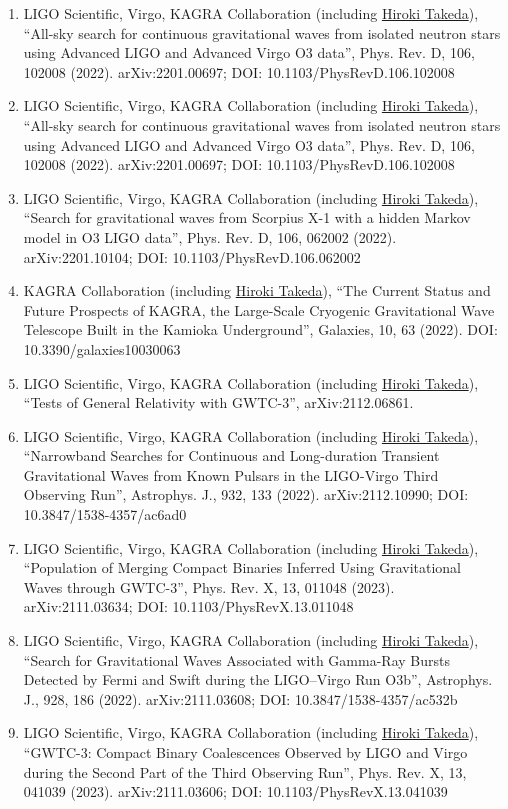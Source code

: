 \documentclass[uplatex, 11pt]{jsarticle}
\begin{document}
\begin{enumerate}
\item LIGO Scientific, Virgo, KAGRA Collaboration (including \uline{Hiroki Takeda}), “All-sky search for continuous gravitational waves from isolated neutron stars using Advanced LIGO and Advanced Virgo O3 data”, Phys. Rev. D, 106, 102008 (2022). arXiv:2201.00697; DOI: 10.1103/PhysRevD.106.102008
\item LIGO Scientific, Virgo, KAGRA Collaboration (including \uline{Hiroki Takeda}), “All-sky search for continuous gravitational waves from isolated neutron stars using Advanced LIGO and Advanced Virgo O3 data”, Phys. Rev. D, 106, 102008 (2022). arXiv:2201.00697; DOI: 10.1103/PhysRevD.106.102008
\item LIGO Scientific, Virgo, KAGRA Collaboration (including \uline{Hiroki Takeda}), “Search for gravitational waves from Scorpius X-1 with a hidden Markov model in O3 LIGO data”, Phys. Rev. D, 106, 062002 (2022). arXiv:2201.10104; DOI: 10.1103/PhysRevD.106.062002
\item KAGRA Collaboration (including \uline{Hiroki Takeda}), “The Current Status and Future Prospects of KAGRA, the Large-Scale Cryogenic Gravitational Wave Telescope Built in the Kamioka Underground”, Galaxies, 10, 63 (2022). DOI: 10.3390/galaxies10030063
\item LIGO Scientific, Virgo, KAGRA Collaboration (including \uline{Hiroki Takeda}), “Tests of General Relativity with GWTC-3”, arXiv:2112.06861.
\item LIGO Scientific, Virgo, KAGRA Collaboration (including \uline{Hiroki Takeda}), “Narrowband Searches for Continuous and Long-duration Transient Gravitational Waves from Known Pulsars in the LIGO-Virgo Third Observing Run”, Astrophys. J., 932, 133 (2022). arXiv:2112.10990; DOI: 10.3847/1538-4357/ac6ad0
\item LIGO Scientific, Virgo, KAGRA Collaboration (including \uline{Hiroki Takeda}), “Population of Merging Compact Binaries Inferred Using Gravitational Waves through GWTC-3”, Phys. Rev. X, 13, 011048 (2023). arXiv:2111.03634; DOI: 10.1103/PhysRevX.13.011048
\item LIGO Scientific, Virgo, KAGRA Collaboration (including \uline{Hiroki Takeda}), “Search for Gravitational Waves Associated with Gamma-Ray Bursts Detected by Fermi and Swift during the LIGO–Virgo Run O3b”, Astrophys. J., 928, 186 (2022). arXiv:2111.03608; DOI: 10.3847/1538-4357/ac532b
\item LIGO Scientific, Virgo, KAGRA Collaboration (including \uline{Hiroki Takeda}), “GWTC-3: Compact Binary Coalescences Observed by LIGO and Virgo during the Second Part of the Third Observing Run”, Phys. Rev. X, 13, 041039 (2023). arXiv:2111.03606; DOI: 10.1103/PhysRevX.13.041039

\end{enumerate}
\end{document}

